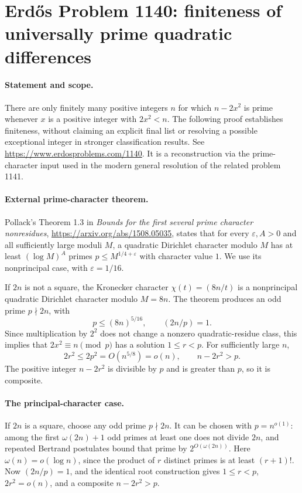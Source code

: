 \section*{Erd\H{o}s Problem 1140: finiteness of universally prime quadratic differences}

\paragraph{Statement and scope.}
There are only finitely many positive integers \(n\) for which \(n-2x^2\) is prime whenever \(x\) is a positive integer with \(2x^2<n\).
The following proof establishes finiteness, without claiming an explicit final list or resolving a possible exceptional integer in stronger classification results. See \url{https://www.erdosproblems.com/1140}. It is a reconstruction via the prime-character input used in the modern general resolution of the related problem 1141.

\paragraph{External prime-character theorem.}
Pollack's Theorem 1.3 in \emph{Bounds for the first several prime character nonresidues}, \url{https://arxiv.org/abs/1508.05035}, states that for every \(\varepsilon,A>0\) and all sufficiently large moduli \(M\), a quadratic Dirichlet character modulo \(M\) has at least \((\log M)^A\) primes \(p\leq M^{1/4+\varepsilon}\) with character value \(1\). We use its nonprincipal case, with \(\varepsilon=1/16\).

If \(2n\) is not a square, the Kronecker character
\(\chi(t)=(8n/t)\) is a nonprincipal quadratic Dirichlet character modulo \(M=8n\).
The theorem produces an odd prime \(p\nmid2n\), with
\[
 p\leq(8n)^{5/16},\qquad (2n/p)=1.
\]
Since multiplication by \(2^2\) does not change a nonzero quadratic-residue class, this implies that \(2x^2\equiv n\pmod p\) has a solution \(1\leq r<p\).
For sufficiently large \(n\),
\[
 2r^2\leq2p^2=O(n^{5/8})=o(n),
 \qquad n-2r^2>p.
\]
The positive integer \(n-2r^2\) is divisible by \(p\) and is greater than \(p\), so it is composite.

\paragraph{The principal-character case.}
If \(2n\) is a square, choose any odd prime \(p\nmid2n\). It can be chosen with \(p=n^{o(1)}\): among the first \(\omega(2n)+1\) odd primes at least one does not divide \(2n\), and repeated Bertrand postulates bound that prime by \(2^{O(\omega(2n))}\).
Here \(\omega(n)=o(\log n)\), since the product of \(r\) distinct primes is at least \((r+1)!\).
Now \((2n/p)=1\), and the identical root construction gives \(1\leq r<p\), \(2r^2=o(n)\), and a composite \(n-2r^2>p\).

